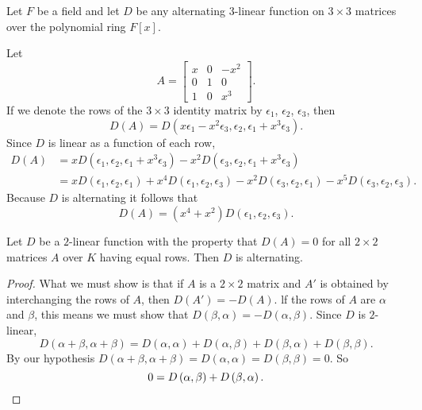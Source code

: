 \begin{example}
    Let \(F\) be a field and let \(D\) be any alternating \(3\)-linear function on \(3\times3\) matrices over the polynomial ring \(F\left[x\right]\).

    Let
    \begin{equation*}
        A=
        \begin{bmatrix}
            x & 0 & -x^2 \\
            0 & 1 & 0 \\
            1 & 0 & x^3
        \end{bmatrix}
        .
    \end{equation*}
    If we denote the rows of the \(3\times3\) identity matrix by \(\epsilon_1\), \(\epsilon_2\), \(\epsilon_3\), then
    \begin{equation*}
        D\left(A\right)=D\left(x\epsilon_1-x^2\epsilon_3,\epsilon_2,\epsilon_1+x^3\epsilon_3\right).
    \end{equation*}
    Since \(D\) is linear as a function of each row,
    \begin{align*}
        D\left(A\right)&=xD\left(\epsilon_1,\epsilon_2,\epsilon_1+x^3\epsilon_3\right)-x^2D\left(\epsilon_3,\epsilon_2,\epsilon_1+x^3\epsilon_3\right)\\
        &=xD\left(\epsilon_1,\epsilon_2,\epsilon_1\right)+x^4D\left(\epsilon_1,\epsilon_2,\epsilon_3\right)-x^2D\left(\epsilon_3,\epsilon_2,\epsilon_1\right)-x^5D\left(\epsilon_3,\epsilon_2,\epsilon_3\right).
    \end{align*}
    Because \(D\) is alternating it follows that
    \begin{equation*}
        D\left(A\right)=\left(x^4+x^2\right)D\left(\epsilon_1,\epsilon_2,\epsilon_3\right).
    \end{equation*}
\end{example}

\begin{lemma}
    Let \(D\) be a \(2\)-linear function with the property that \(D\left(A\right)=0\) for all \(2\times2\) matrices \(A\) over \(K\) having equal rows. Then \(D\) is alternating.
\end{lemma}

\begin{proof}
    What we must show is that if \(A\) is a \(2\times2\) matrix and \(A'\) is obtained by interchanging the rows of \(A\), then \(D\left(A'\right)=-D\left(A\right)\). lf the rows of \(A\) are \(\alpha\) and \(\beta\), this means we must show that \(D\left(\beta,\alpha\right)=-D\left(\alpha,\beta\right)\). Since \(D\) is \(2\)-linear,
    \begin{equation*}
    D\left(\alpha+\beta,\alpha+\beta\right)=D\left(\alpha,\alpha\right)+D\left(\alpha,\beta\right)+D\left(\beta,\alpha\right)+D\left(\beta,\beta\right).
    \end{equation*}
    By our hypothesis \(D\left(\alpha+\beta,\alpha+\beta\right)=D\left(\alpha,\alpha\right)=D\left(\beta,\beta\right)=0\). So
    \begin{equation*}
        0=D\left(\alpha,\beta\right)+D\left(\beta,\alpha\right).\qedhere
    \end{equation*}
\end{proof}

